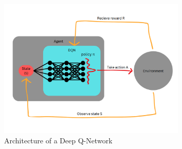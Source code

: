 \begin{figure}[H]
    \centering
    \includegraphics[width=0.8\textwidth]{figures/dqn_architecture}
    \caption{Architecture of a Deep Q-Network}
    \label{fig:dqn-architecture}
\end{figure}